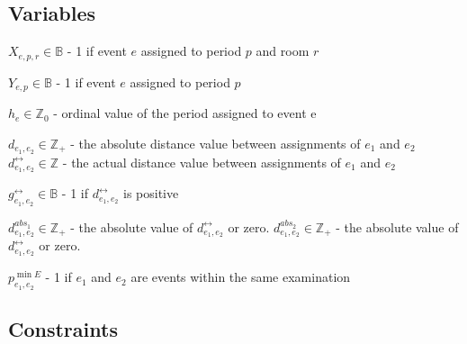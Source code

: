 \documentclass{article}
\newcommand{\B}{\mathbb{B}}
\newcommand{\Z}{\mathbb{Z}}
\begin{document}
\subsection{Variables}

$X_{e,p,r} \in \B$ - 1 if event $e$ assigned to period $p$ and room $r$

$Y_{e,p} \in \B$ - 1 if event $e$ assigned to period $p$

$h_e\in \Z_0$ - ordinal value of the period assigned to event e

$d_{e_1, e_2} \in \Z_+$ - the absolute distance value between assignments of $e_1$ and $e_2$
$d^{\leftrightarrow}_{e_1, e_2} \in \Z$ - the actual distance value between assignments of $e_1$ and $e_2$

$g^{\leftrightarrow}_{e_1, e_2} \in \B$ - 1 if $d^{\leftrightarrow}_{e_1, e_2}$ is positive

$d^{abs_1}_{e_1, e_2}\in \Z_+$ - the absolute value of $d^{\leftrightarrow}_{e_1, e_2}$ or zero.
$d^{abs_2}_{e_1, e_2}\in \Z_+$ - the absolute value of $d^{\leftrightarrow}_{e_1, e_2}$ or zero.

$p^{\min E}_{e_1, e_2}$ - 1 if $e_1$ and $e_2$ are events within the same examination

\subsection{Constraints}
\end{document}
